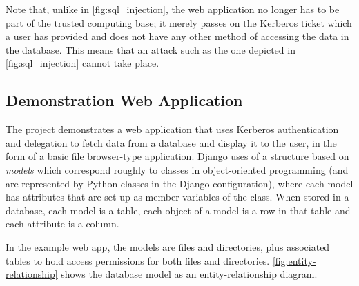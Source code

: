 \documentclass[12pt]{report}
\begin{document}
Note that, unlike in \autoref{fig:sql_injection}, the web application no longer has to be part of the trusted computing base; it merely passes on the Kerberos ticket which a user has provided and does not have any other method of accessing the data in the database. This means that an attack such as the one depicted in \autoref{fig:sql_injection} cannot take place.

\subsection{Demonstration Web Application}
\label{sec:demonstration_web_application}
The project demonstrates a web application that uses Kerberos authentication and delegation to fetch data from a database and display it to the user, in the form of a basic file browser-type application. Django uses of a structure based on \textit{models} which correspond roughly to classes in object-oriented programming (and are represented by Python classes in the Django configuration), where each model has attributes that are set up as member variables of the class. When stored in a database, each model is a table, each object of a model is a row in that table and each attribute is a column.

In the example web app, the models are files and directories, plus associated tables to hold access permissions for both files and directories. \autoref{fig:entity-relationship} shows the database model as an entity-relationship diagram.
\end{document}
